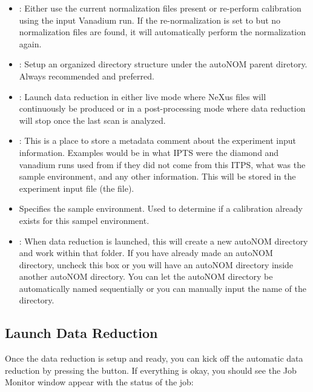 \begin{itemize}
\item {}:   Either use the current normalization files present or re-perform calibration using the input Vanadium run. If the re-normalization is set to  but no normalization files are found, it will automatically perform the normalization again. 

\item {}: Setup an organized directory structure under the autoNOM parent diretory. Always recommended and preferred.

\item {}: Launch data reduction in either live mode where NeXus files will continuously be produced or in a post-processing mode where data reduction will stop once the last scan is analyzed. 

\item {}: This is a place to store a metadata comment about the experiment input information. Examples would be in what IPTS were the diamond and vanadium runs used from if they did not come from this ITPS, what was the sample environment, and any other information. This will be stored in the experiment input file (the  file).

\item {} Specifies the sample environment. Used to determine if a calibration already exists for this sampel environment.

\item {}: When data reduction is launched, this will create a new autoNOM directory and work within that folder. If you have already made an autoNOM directory, uncheck this box or you will have an autoNOM directory inside another autoNOM directory. You can let the autoNOM directory be automatically named sequentially or you can manually input the name of the directory.

\end{itemize}

\subsection{Launch Data Reduction}
Once the data reduction is setup and ready, you can kick off the automatic data reduction by pressing the  button. If everything is okay, you should see the Job Monitor window appear with the status of the job: 

